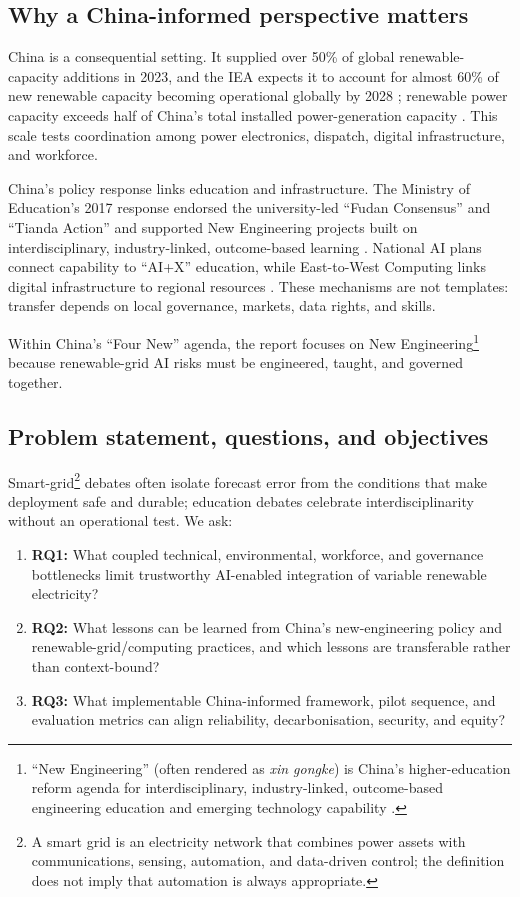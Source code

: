 \documentclass[12pt]{article}
\begin{document}
\subsection{Why a China-informed perspective matters}
China is a consequential setting. It supplied over 50\% of global renewable-capacity additions in 2023, and the IEA expects it to account for almost 60\% of new renewable capacity becoming operational globally by 2028 \cite{iea2024renewables}; renewable power capacity exceeds half of China's total installed power-generation capacity \cite{nea2024}. This scale tests coordination among power electronics, dispatch, digital infrastructure, and workforce.

China's policy response links education and infrastructure. The Ministry of Education's 2017 response endorsed the university-led ``Fudan Consensus'' and ``Tianda Action'' and supported New Engineering projects built on interdisciplinary, industry-linked, outcome-based learning \cite{moe2017}. National AI plans connect capability to ``AI+X'' education, while East-to-West Computing links digital infrastructure to regional resources \cite{ndrc2022}. These mechanisms are not templates: transfer depends on local governance, markets, data rights, and skills.

Within China's ``Four New'' agenda, the report focuses on New Engineering\footnote{``New Engineering'' (often rendered as \textit{xin gongke}) is China's higher-education reform agenda for interdisciplinary, industry-linked, outcome-based engineering education and emerging technology capability \cite{moe2017}.} because renewable-grid AI risks must be engineered, taught, and governed together.

\subsection{Problem statement, questions, and objectives}
Smart-grid\footnote{A smart grid is an electricity network that combines power assets with communications, sensing, automation, and data-driven control; the definition does not imply that automation is always appropriate.} debates often isolate forecast error from the conditions that make deployment safe and durable; education debates celebrate interdisciplinarity without an operational test. We ask:

\begin{enumerate}
  \item \textbf{RQ1:} What coupled technical, environmental, workforce, and governance bottlenecks limit trustworthy AI-enabled integration of variable renewable electricity?
  \item \textbf{RQ2:} What lessons can be learned from China's new-engineering policy and renewable-grid/computing practices, and which lessons are transferable rather than context-bound?
  \item \textbf{RQ3:} What implementable China-informed framework, pilot sequence, and evaluation metrics can align reliability, decarbonisation, security, and equity?
\end{enumerate}
\end{document}
